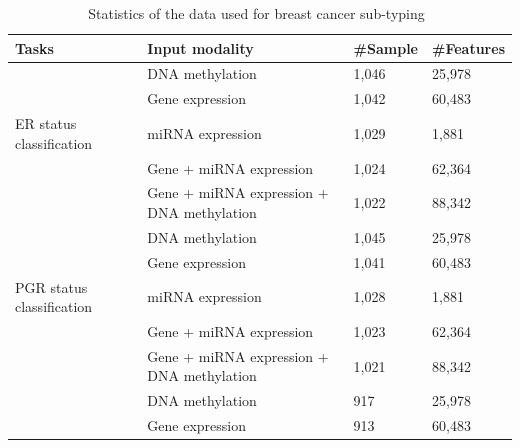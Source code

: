 \begin{table}[h]
    \scriptsize
    \caption{Statistics of the data used for breast cancer sub-typing~\cite{karimACCESS2019}}
    	\vspace{-2mm}
    \label{tab:all_data_brca}
    \centering
    \begin{tabular}{l|l|l|l} 

        \hline
        \textbf{Tasks}   & \textbf{Input modality} & \textbf{\#Sample } & \textbf{\#Features}  \\ 
        \hline
             & DNA methylation  & 1,046  & 25,978  \\ 
        \cline{2-4}
               & Gene expression   & 1,042 & 60,483      \\ 
        \cline{2-4}
        ER status classification       & miRNA expression                           & 1,029                & 1,881       \\ 
        \cline{2-4}
                                       & Gene + miRNA expression                   & 1,024                & 62,364      \\ 
        \cline{2-4}
                                       & Gene + miRNA expression + DNA methylation & 1,022                & 88,342      \\ 
        \hline
                                       & DNA methylation                           & 1,045                & 25,978      \\ 
        \cline{2-4}
                                       & Gene expression                           & 1,041                & 60,483      \\ 
        \cline{2-4}
        PGR status classification      & miRNA expression                           & 1,028                & 1,881       \\ 
        \cline{2-4}
                                       & Gene + miRNA expression                   & 1,023                & 62,364      \\ 
        \cline{2-4}
                                       & Gene + miRNA expression + DNA methylation & 1,021                & 88,342      \\ 
        \hline
                                       & DNA methylation                           & 917                  & 25,978      \\ 
        \cline{2-4}
                                       & Gene expression                           & 913                  & 60,483      \\ 
        \cline{2-4}

\end{tabular}
\end{table}
